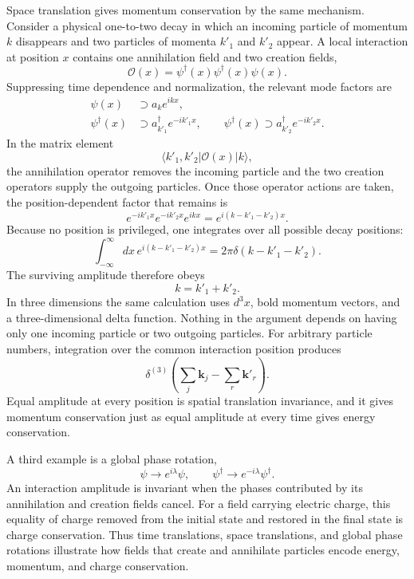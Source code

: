 Space translation gives momentum conservation by the same mechanism. Consider a physical one-to-two decay in which an incoming particle of momentum \(k\) disappears and two particles of momenta \(k'_1\) and \(k'_2\) appear. A local interaction at position \(x\) contains one annihilation field and two creation fields,
\begin{equation}
\mathcal{O}(x)=\psi^\dagger(x)\psi^\dagger(x)\psi(x).
\end{equation}
Suppressing time dependence and normalization, the relevant mode factors are
\begin{align}
\psi(x)&\supset a_k e^{ikx},
\\
\psi^\dagger(x)&\supset a_{k'_1}^\dagger e^{-ik'_1x},
\qquad
\psi^\dagger(x)\supset a_{k'_2}^\dagger e^{-ik'_2x}.
\end{align}
In the matrix element
\begin{equation}
\langle k'_1,k'_2|\mathcal{O}(x)|k\rangle,
\end{equation}
the annihilation operator removes the incoming particle and the two creation operators supply the outgoing particles. Once those operator actions are taken, the position-dependent factor that remains is
\begin{equation}
e^{-ik'_1x}e^{-ik'_2x}e^{ikx}
=e^{i(k-k'_1-k'_2)x}.
\end{equation}
Because no position is privileged, one integrates over all possible decay positions:
\begin{equation}
\int_{-\infty}^{\infty}dx\,
e^{i(k-k'_1-k'_2)x}
=2\pi\delta(k-k'_1-k'_2).
\end{equation}
The surviving amplitude therefore obeys
\begin{equation}
k=k'_1+k'_2.
\end{equation}
In three dimensions the same calculation uses \(d^3x\), bold momentum vectors, and a three-dimensional delta function. Nothing in the argument depends on having only one incoming particle or two outgoing particles. For arbitrary particle numbers, integration over the common interaction position produces
\begin{equation}
\delta^{(3)}\!\left(
\sum_j\mathbf{k}_j-\sum_r\mathbf{k}'_r
\right).
\end{equation}
Equal amplitude at every position is spatial translation invariance, and it gives momentum conservation just as equal amplitude at every time gives energy conservation.

A third example is a global phase rotation,
\begin{equation}
\psi\longrightarrow e^{i\lambda}\psi,
\qquad
\psi^\dagger\longrightarrow e^{-i\lambda}\psi^\dagger.
\end{equation}
An interaction amplitude is invariant when the phases contributed by its annihilation and creation fields cancel. For a field carrying electric charge, this equality of charge removed from the initial state and restored in the final state is charge conservation. Thus time translations, space translations, and global phase rotations illustrate how fields that create and annihilate particles encode energy, momentum, and charge conservation.

